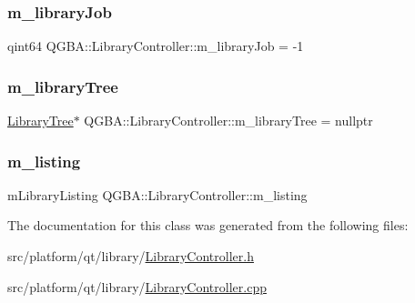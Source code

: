 \subsubsection{\texorpdfstring{m\+\_\+library\+Job}{m\_libraryJob}}
{\footnotesize\ttfamily qint64 Q\+G\+B\+A\+::\+Library\+Controller\+::m\+\_\+library\+Job = -\/1\hspace{0.3cm}{\ttfamily [private]}}

\mbox{\label{class_q_g_b_a_1_1_library_controller_a5e5555572a4417f4b99315aa81eb931a}} 
\subsubsection{\texorpdfstring{m\+\_\+library\+Tree}{m\_libraryTree}}
{\footnotesize\ttfamily \mbox{\hyperlink{class_q_g_b_a_1_1_library_tree}{Library\+Tree}}$\ast$ Q\+G\+B\+A\+::\+Library\+Controller\+::m\+\_\+library\+Tree = nullptr\hspace{0.3cm}{\ttfamily [private]}}

\mbox{\label{class_q_g_b_a_1_1_library_controller_af92b619ecb1b255a005264d98f5e5774}} 
\subsubsection{\texorpdfstring{m\+\_\+listing}{m\_listing}}
{\footnotesize\ttfamily m\+Library\+Listing Q\+G\+B\+A\+::\+Library\+Controller\+::m\+\_\+listing\hspace{0.3cm}{\ttfamily [private]}}



The documentation for this class was generated from the following files\+:\begin{DoxyCompactItemize}
\item 
src/platform/qt/library/\mbox{\hyperlink{_library_controller_8h}{Library\+Controller.\+h}}\item 
src/platform/qt/library/\mbox{\hyperlink{_library_controller_8cpp}{Library\+Controller.\+cpp}}\end{DoxyCompactItemize}
